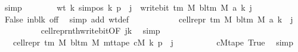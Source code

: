 \begin{isabellebody}
\ simp\isanewline
\ \ \ \ \ \ \isamarkupfalse%
\ {\isachardoublequoteopen}wt\ k\ {\isacharparenleft}{\kern0pt}sim{\isacharunderscore}{\kern0pt}pos\ {\isacharquery}{\kern0pt}k\ p\ {\isacharplus}{\kern0pt}\ j{\isacharparenright}{\kern0pt}\ {\isacharequal}{\kern0pt}\ write{\isacharunderscore}{\kern0pt}bit\ {\isacharparenleft}{\kern0pt}{\isasymGamma}{\isacharunderscore}{\kern0pt}tm\ M{\isacharparenright}{\kern0pt}\ {\isacharparenleft}{\kern0pt}bl{\isacharunderscore}{\kern0pt}tm\ M{\isacharparenright}{\kern0pt}\ {\isacharparenleft}{\kern0pt}a{\isacharprime}{\kern0pt}\ k{\isacharparenright}{\kern0pt}\ j{\isachardoublequoteclose}\isanewline
\ \ \ \ \ \ \ \ \isamarkupfalse%
\ False\ inblk\ off\ \isamarkupfalse%
\ {\isacharparenleft}{\kern0pt}simp\ add{\isacharcolon}{\kern0pt}\ wt{\isacharunderscore}{\kern0pt}def{\isacharparenright}{\kern0pt}\isanewline
\ \ \ \ \ \ \isamarkupfalse%
\ \isamarkupfalse%
\ {\isachardoublequoteopen}{\isasymdots}\ {\isacharequal}{\kern0pt}\ cell{\isacharunderscore}{\kern0pt}repr\ {\isacharparenleft}{\kern0pt}{\isasymGamma}{\isacharunderscore}{\kern0pt}tm\ M{\isacharparenright}{\kern0pt}\ {\isacharparenleft}{\kern0pt}bl{\isacharunderscore}{\kern0pt}tm\ M{\isacharparenright}{\kern0pt}\ {\isacharparenleft}{\kern0pt}a{\isacharprime}{\kern0pt}\ k{\isacharparenright}{\kern0pt}\ {\isacharbang}{\kern0pt}\ j{\isachardoublequoteclose}\isanewline
\ \ \ \ \ \ \ \ \isamarkupfalse%
\ cell{\isacharunderscore}{\kern0pt}repr{\isacharunderscore}{\kern0pt}nth{\isacharunderscore}{\kern0pt}write{\isacharunderscore}{\kern0pt}bit{\isacharbrackleft}{\kern0pt}OF\ jk{\isacharbrackright}{\kern0pt}\ \isamarkupfalse%
\ simp\isanewline
\ \ \ \ \ \ \isamarkupfalse%
\ \isamarkupfalse%
\ {\isachardoublequoteopen}{\isasymdots}\ {\isacharequal}{\kern0pt}\ cell{\isacharunderscore}{\kern0pt}repr\ {\isacharparenleft}{\kern0pt}{\isasymGamma}{\isacharunderscore}{\kern0pt}tm\ M{\isacharparenright}{\kern0pt}\ {\isacharparenleft}{\kern0pt}bl{\isacharunderscore}{\kern0pt}tm\ M{\isacharparenright}{\kern0pt}\ {\isacharparenleft}{\kern0pt}mt{\isacharunderscore}{\kern0pt}tape\ cM{\isacharunderscore}{\kern0pt}{}\ k\ p{\isacharparenright}{\kern0pt}\ {\isacharbang}{\kern0pt}\ j{\isachardoublequoteclose}\isanewline
\ \ \ \ \ \ \ \ \isamarkupfalse%
\ cM{}tape\ True\ \isamarkupfalse%
\ simp\isanewline
\ \ \ \ \ \ \isamarkupfalse%

\end{isabellebody}
